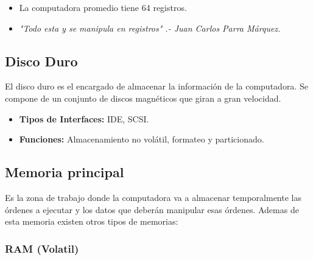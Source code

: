 \documentclass{templateNote}
\begin{document}
\begin{tcolorbox}[colback=orange!10!white,colframe=orange!75!black,title=Observaciones]
    \begin{itemize}
        \item La computadora promedio tiene 64 registros.%
        \item \textit{"Todo esta y se manipula en registros" \space.- Juan Carlos Parra Márquez.}
    \end{itemize}
\end{tcolorbox}

\subsection{Disco Duro}
\noindent El disco duro es el encargado de almacenar la información de la computadora. Se compone de un conjunto de discos magnéticos que giran a gran velocidad.
\begin{itemize}
    \item \textbf{Tipos de Interfaces:} IDE, SCSI.
    \item \textbf{Funciones:} Almacenamiento no volátil, formateo y particionado.
\end{itemize}

\subsection{Memoria principal} 
\noindent Es la zona de trabajo donde la computadora va a almacenar temporalmente las órdenes a ejecutar y los datos que deberán manipular esas órdenes. Ademas de esta memoria existen otros tipos de memorias:

\subsubsection{RAM (Volatil)}
\begin{figure}[H]
    \centering
\end{figure}
\end{document}
